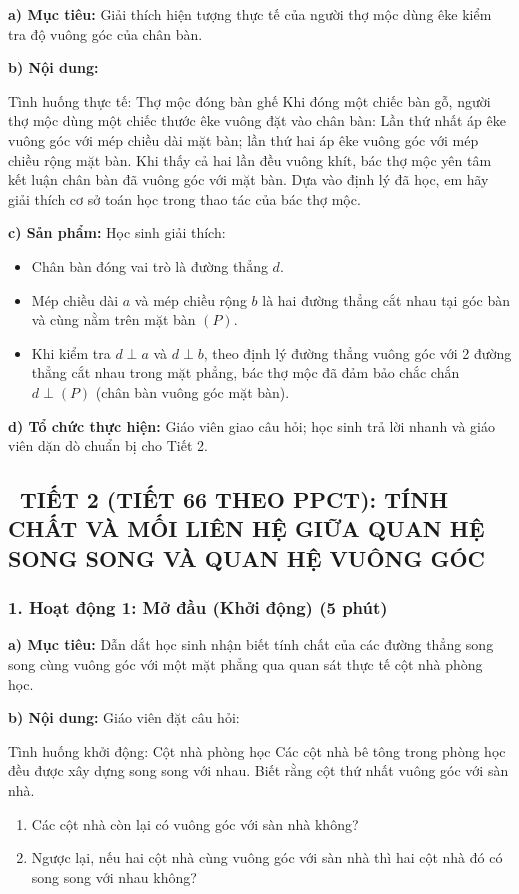 \documentclass[12pt, a4paper]{article}
\begin{document}
\noindent \textbf{a) Mục tiêu:}
Giải thích hiện tượng thực tế của người thợ mộc dùng êke kiểm tra độ vuông góc của chân bàn.

\noindent \textbf{b) Nội dung:}
\begin{pedabox}{Tình huống thực tế: Thợ mộc đóng bàn ghế}
Khi đóng một chiếc bàn gỗ, người thợ mộc dùng một chiếc thước êke vuông đặt vào chân bàn: Lần thứ nhất áp êke vuông góc với mép chiều dài mặt bàn; lần thứ hai áp êke vuông góc với mép chiều rộng mặt bàn. Khi thấy cả hai lần đều vuông khít, bác thợ mộc yên tâm kết luận chân bàn đã vuông góc với mặt bàn.
Dựa vào định lý đã học, em hãy giải thích cơ sở toán học trong thao tác của bác thợ mộc.
\end{pedabox}

\noindent \textbf{c) Sản phẩm:}
Học sinh giải thích:
\begin{itemize}
    \item Chân bàn đóng vai trò là đường thẳng $d$.
    \item Mép chiều dài $a$ và mép chiều rộng $b$ là hai đường thẳng cắt nhau tại góc bàn và cùng nằm trên mặt bàn $(P)$.
    \item Khi kiểm tra $d \perp a$ và $d \perp b$, theo định lý đường thẳng vuông góc với 2 đường thẳng cắt nhau trong mặt phẳng, bác thợ mộc đã đảm bảo chắc chắn $d \perp (P)$ (chân bàn vuông góc mặt bàn).
\end{itemize}

\noindent \textbf{d) Tổ chức thực hiện:}
Giáo viên giao câu hỏi; học sinh trả lời nhanh và giáo viên dặn dò chuẩn bị cho Tiết 2.

\vspace{10pt}

\subsection*{\faClockO \ TIẾT 2 (TIẾT 66 THEO PPCT): TÍNH CHẤT VÀ MỐI LIÊN HỆ GIỮA QUAN HỆ SONG SONG VÀ QUAN HỆ VUÔNG GÓC}

\subsubsection*{1. Hoạt động 1: Mở đầu (Khởi động) (5 phút)}

\noindent \textbf{a) Mục tiêu:}
Dẫn dắt học sinh nhận biết tính chất của các đường thẳng song song cùng vuông góc với một mặt phẳng qua quan sát thực tế cột nhà phòng học.

\noindent \textbf{b) Nội dung:}
Giáo viên đặt câu hỏi:
\begin{pedabox}{Tình huống khởi động: Cột nhà phòng học}
Các cột nhà bê tông trong phòng học đều được xây dựng song song với nhau. Biết rằng cột thứ nhất vuông góc với sàn nhà.
\begin{enumerate}[leftmargin=0.6cm]
    \item Các cột nhà còn lại có vuông góc với sàn nhà không?
    \item Ngược lại, nếu hai cột nhà cùng vuông góc với sàn nhà thì hai cột nhà đó có song song với nhau không?
\end{enumerate}
\end{pedabox}
\end{document}
